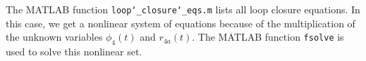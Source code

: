 \documentclass[a4paper]{article}
\begin{document}
%	

The MATLAB function \texttt{loop\char`_closure\char`_eqs.m} lists all loop closure equations. In this case, we get a nonlinear system of equations because of the multiplication of the unknown variables \(\phi_4(t)\) and \(r_{4a}(t)\). The MATLAB function \texttt{fsolve} is used to solve this nonlinear set.
\end{document}
